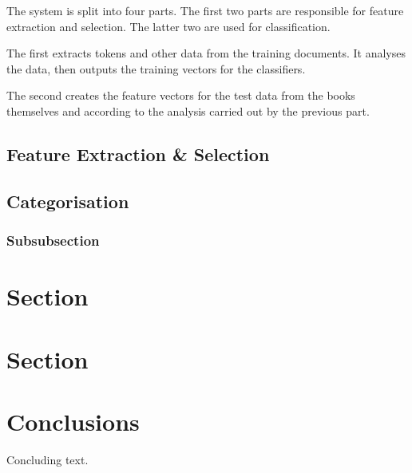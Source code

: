 \documentclass[11pt]{article}
\begin{document}
The system is split into four parts. The first two parts are responsible for
feature extraction and selection. The latter two are used for classification.

The first extracts tokens and other data from the training documents. It
analyses the data, then outputs the training vectors for the classifiers. 

The second creates the feature vectors for the test data from the books
themselves and according to the analysis carried out by the previous part.



\subsection{Feature Extraction & Selection}



\subsection{Categorisation}


 
\subsubsection{Subsubsection}


\begin{comment}
    \begin{table}[h]
     \begin{center}
        \begin{tabular}{|l|l|}

              \hline
              Corpus & Features\\
              \hline\hline
              AAA & 1M words\\
              BBB & spoken corpus (expensive)\\
              CCC & 2M words\\
                & free (to academics)\\
              \hline

        \end{tabular}
    \caption{The caption of the table}\label{table1}
     \end{center}
    \end{table}
\end{comment}




\section{Section}

\section{Section}

\section{Conclusions}

Concluding text.



\end{document}
